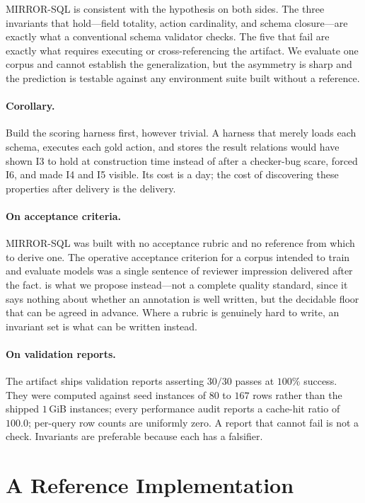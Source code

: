 \documentclass[11pt,letterpaper]{article}
\theoremstyle{definition}
\theoremstyle{plain}
\theoremstyle{remark}
\begin{document}
MIRROR-SQL is consistent with the hypothesis on both sides. The three invariants that
hold---field totality, action cardinality, and schema closure---are exactly what a
conventional schema validator checks. The five that fail are exactly what requires executing
or cross-referencing the artifact. We evaluate one corpus and cannot establish the
generalization, but the asymmetry is sharp and the prediction is testable against any
environment suite built without a reference.

\paragraph{Corollary.}
Build the scoring harness first, however trivial. A harness that merely loads each schema,
executes each gold action, and stores the result relations would have shown I3 to hold at
construction time instead of after a checker-bug scare, forced I6, and made I4 and I5 visible.
Its cost is a day; the cost of discovering these properties after delivery is the delivery.

\paragraph{On acceptance criteria.}
MIRROR-SQL was built with no acceptance rubric and no reference from which to derive one. The
operative acceptance criterion for a corpus intended to train and evaluate models was a single
sentence of reviewer impression delivered after the fact.  is what we
propose instead---not a complete quality standard, since it says nothing about whether an
annotation is well written, but the decidable floor that can be agreed in advance. Where a
rubric is genuinely hard to write, an invariant set is what can be written instead.

\paragraph{On validation reports.}
The artifact ships validation reports asserting $30/30$ passes at $100\%$ success. They were
computed against seed instances of $80$ to $167$ rows rather than the shipped $1$\,GiB
instances; every performance audit reports a cache-hit ratio of $100.0$; per-query row counts
are uniformly zero. A report that cannot fail is not a check. Invariants are preferable
because each has a falsifier.

\section{A Reference Implementation}
\label{sec:gym}
\end{document}

